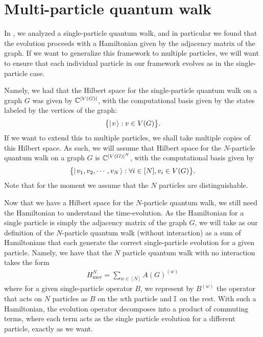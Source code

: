 \documentclass[../thesis-main/thesis-main]{subfiles}
\begin{document}
\section{Multi-particle quantum walk}

In , we analyzed a single-particle quantum walk, and in particular we found that the evolution proceeds with a Hamiltonian given by the adjacency matrix of the graph.  If we want to generalize this framework to multiple particles, we will want to ensure that each individual particle in our framework evolves as in the single-particle case.

Namely, we had that the Hilbert space for the single-particle quantum walk on a graph $G$ was given by $\mathbb{C}^{|V(G)|}$, with the computational basis given by the states labeled by the vertices of the graph:
\begin{align}
  \big\{ |\mspace{2mu} v \mspace{2mu} \rangle: v\in V(G)\big\}.
\end{align}
If we want to extend this to multiple particles, we shall take multiple copies of this Hilbert space.  As such, we will assume that Hilbert space for the $N$-particle quantum walk on a graph $G$ is $\mathbb{C}^{|V(G)|^N}$, with the computational basis given by
\begin{align}
  \big\{ |\mspace{2mu} v_1,v_2,\cdots,v_N \mspace{2mu} \rangle : \forall i \in [N], v_i\in V(G)\big\}.
\end{align}
Note that for the moment we assume that the $N$ particles are distinguishable.

Now that we have a Hilbert space for the $N$-particle quantum walk, we still need the Hamiltonian to understand the time-evolution.  As the Hamiltonian for a single particle is simply the adjacency matrix of the graph $G$, we will take as our definition of the $N$-particle quantum walk (without interaction) as a sum of Hamiltonians that each generate the correct single-particle evolution for a given particle.  Namely, we have that the $N$ particle quantum walk with no interaction takes the form
\begin{align}
  H_{\text{mov}}^N = \sum_{w\in [N]} A(G)^{(w)} \label{eq:MPQW_movement}
\end{align}
where for a given single-particle operator $B$, we represent by $B^{(w)}$ the operator that acts on $N$ particles as $B$ on the $w$th particle and $\mathbb{I}$ on the rest.  With such a Hamiltonian, the evolution operator decomposes into a product of commuting terms, where each term acts as the single particle evolution for a different particle, exactly as we want.
\end{document}
